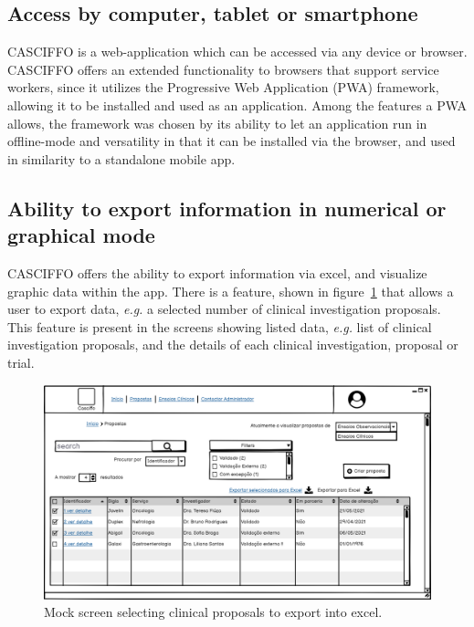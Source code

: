 \subsection{Access by computer, tablet or smartphone}
\label{subsec:access-by-mobile-device}
CASCIFFO is a web-application which can be accessed via any device or browser. CASCIFFO offers an extended functionality to browsers that support service workers, since it utilizes the Progressive Web Application (PWA) framework, allowing it to be installed and used as an application.
Among the features a PWA allows, the framework was chosen by its ability to let an application run in offline-mode and versatility in that it can be installed via the browser, and used in similarity to a standalone mobile app. 

\subsection{Ability to export information in numerical or graphical mode}
\label{subsec:ability-to-export-info}
CASCIFFO offers the ability to export information via excel, and visualize graphic data within the app.  
There is a feature, shown in figure~\ref{fig:proposta-export-excel} that allows a user to export data, \textit{e.g.} a selected number of clinical investigation proposals. This feature is present in the screens showing listed data, \textit{e.g.} list of clinical investigation proposals, and the details of each clinical investigation, proposal or trial.

\begin{figure}[H]
    \centering
    \includegraphics[scale=0.35]{images/propostas-exportar-para-excel.png}
    \caption{Mock screen selecting clinical proposals to export into excel.}
    \label{fig:proposta-export-excel}
\end{figure}

